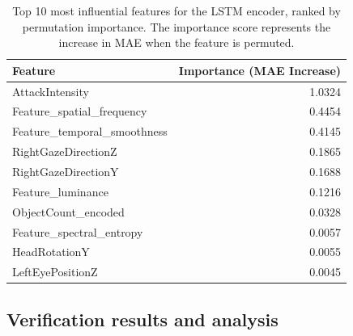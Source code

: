 \documentclass[review]{vgtc}                 %
\begin{document}
\begin{table}[h]
    \centering
    \caption{Top 10 most influential features for the LSTM encoder, ranked by permutation importance. The importance score represents the increase in MAE when the feature is permuted.}
    \label{tab:feature_importance}
    \setlength{\tabcolsep}{6pt}
    \begin{tabular}{lr}
        \toprule
        \textbf{Feature} & \textbf{Importance (MAE Increase)} \\
        \midrule
        AttackIntensity & 1.0324 \\
        Feature\_spatial\_frequency & 0.4454 \\
        Feature\_temporal\_smoothness & 0.4145 \\
        RightGazeDirectionZ & 0.1865 \\
        RightGazeDirectionY & 0.1688 \\
        Feature\_luminance & 0.1216 \\
        ObjectCount\_encoded & 0.0328 \\
        Feature\_spectral\_entropy & 0.0057 \\
        HeadRotationY & 0.0055 \\
        LeftEyePositionZ & 0.0045 \\
        \bottomrule
    \end{tabular}
\end{table}

\subsection{Verification results and analysis}

\label{sec:verification-results}
\end{document}
